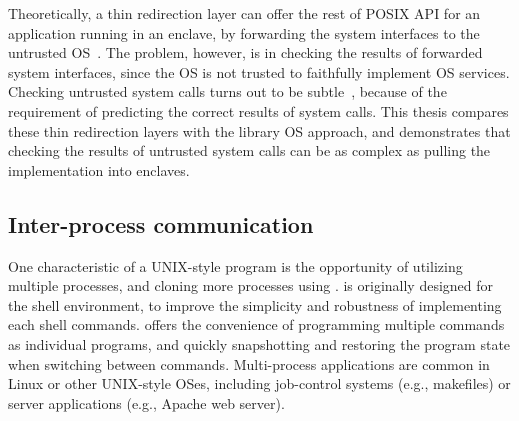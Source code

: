 Theoretically, a thin redirection layer can offer the rest of POSIX API for an application running in an enclave,
by forwarding the system interfaces to the untrusted OS~\cite{osdi16scone,shinde17panoply}.
The problem, however, is in checking the results of forwarded system interfaces, since the OS is not trusted to faithfully implement OS services.
Checking untrusted system calls turns out to be subtle~\cite{checkoway13iago},
because of the requirement of predicting the correct results of system calls.
This thesis compares these thin redirection layers
with the library OS approach,
and demonstrates that checking the results of untrusted system calls
can be as complex as 
pulling the implementation into enclaves.







\subsection{Inter-process communication}


One characteristic of a UNIX-style program is the opportunity of utilizing multiple processes, and cloning more processes using .
 is originally designed for the shell environment,
to improve the simplicity and robustness of implementing each shell commands.
 offers the convenience of programming multiple commands as individual programs,
and quickly snapshotting and restoring the program state
when switching between commands.
Multi-process applications are common
in Linux or other UNIX-style OSes, including job-control systems (e.g., makefiles) or server applications (e.g., Apache web server).


